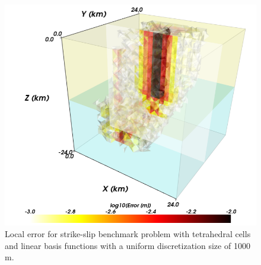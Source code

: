 \noindent \begin{center}
\begin{figure}[H]
\begin{centering}
\includegraphics[scale=0.33]{benchmarks/strikeslip/figs/error_tet4_1000m}
\par\end{centering}

\caption{Local error for strike-slip benchmark problem with tetrahedral cells
and linear basis functions with a uniform discretization size of 1000
m.\label{fig:benchmark:strikeslip:tet4:1000m}}
\end{figure}

\par\end{center}

